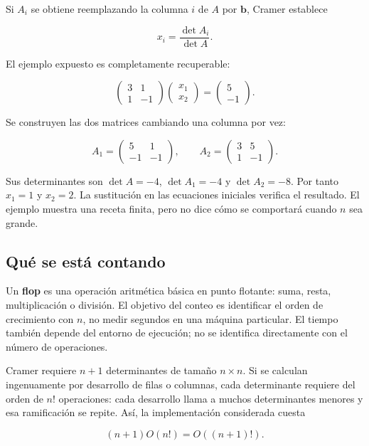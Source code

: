 \documentclass[12pt,a4paper]{article}
\begin{document}
Si $A_i$ se obtiene reemplazando la columna $i$ de $A$ por $\mathbf b$, Cramer establece

\[
\boxed{x_i=\frac{\det A_i}{\det A}}.
\]

El ejemplo expuesto es completamente recuperable:

\[
\begin{pmatrix}3&1\\1&-1\end{pmatrix}
\begin{pmatrix}x_1\\x_2\end{pmatrix}
=\begin{pmatrix}5\\-1\end{pmatrix}.
\]

Se construyen las dos matrices cambiando una columna por vez:

\[
A_1=\begin{pmatrix}5&1\\-1&-1\end{pmatrix},\qquad
A_2=\begin{pmatrix}3&5\\1&-1\end{pmatrix}.
\]

Sus determinantes son $\det A=-4$, $\det A_1=-4$ y $\det A_2=-8$. Por tanto $x_1=1$ y $x_2=2$. La sustitución en las ecuaciones iniciales verifica el resultado. El ejemplo muestra una receta finita, pero no dice cómo se comportará cuando $n$ sea grande.

\subsection{Qué se está contando}

Un \textbf{flop} es una operación aritmética básica en punto flotante: suma, resta, multiplicación o división. El objetivo del conteo es identificar el orden de crecimiento con $n$, no medir segundos en una máquina particular. El tiempo también depende del entorno de ejecución; no se identifica directamente con el número de operaciones.

Cramer requiere $n+1$ determinantes de tamaño $n\times n$. Si se calculan ingenuamente por desarrollo de filas o columnas, cada determinante requiere del orden de $n!$ operaciones: cada desarrollo llama a muchos determinantes menores y esa ramificación se repite. Así, la implementación considerada cuesta

\[
(n+1)O(n!)=O((n+1)!).
\]
\end{document}

